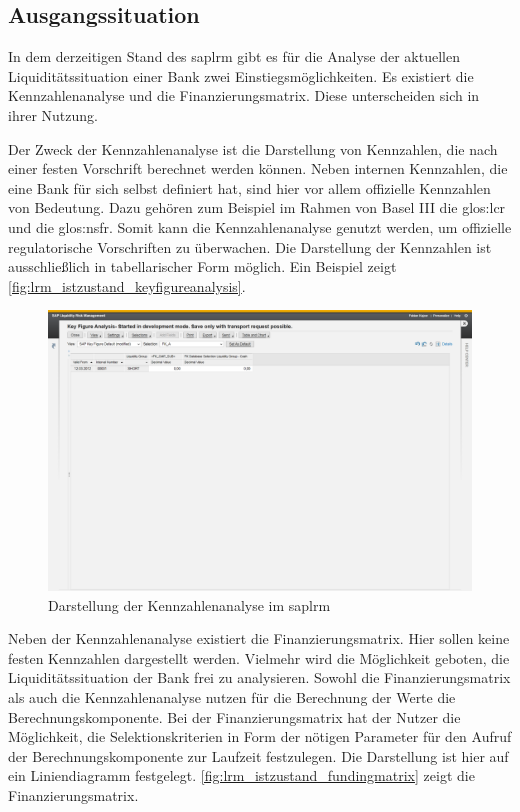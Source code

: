 \begin{onehalfspacing}
\section{Ausgangssituation}
In dem derzeitigen Stand des \gls{saplrm} gibt es für die Analyse der aktuellen Liquiditätssituation einer Bank zwei Einstiegsmöglichkeiten. Es existiert die Kennzahlenanalyse und die Finanzierungsmatrix. Diese unterscheiden sich in ihrer Nutzung.

Der Zweck der Kennzahlenanalyse ist die Darstellung von Kennzahlen, die nach einer festen Vorschrift berechnet werden können. Neben internen Kennzahlen, die eine Bank für sich selbst definiert hat, sind hier vor allem offizielle Kennzahlen von Bedeutung. Dazu gehören zum Beispiel im Rahmen von Basel III die \gls{glos:lcr} und die \gls{glos:nsfr}. Somit kann die Kennzahlenanalyse genutzt werden, um offizielle regulatorische Vorschriften zu überwachen. Die Darstellung der Kennzahlen ist ausschließlich in tabellarischer Form möglich. Ein Beispiel zeigt \vref{fig:lrm_istzustand_keyfigureanalysis}.

\begin{figure}[ht]
\centering
\setlength{\unitlength}{1mm}
\includegraphics[width=15cm]{images/KeyFigureAnalysis_Example-crop.png}
\caption{Darstellung der Kennzahlenanalyse im \gls{saplrm}\label{fig:lrm_istzustand_keyfigureanalysis}}
\end{figure}

Neben der Kennzahlenanalyse existiert die Finanzierungsmatrix. Hier sollen keine festen Kennzahlen dargestellt werden. Vielmehr wird die Möglichkeit geboten, die Liquiditätssituation der Bank frei zu analysieren. Sowohl die Finanzierungsmatrix als auch die Kennzahlenanalyse nutzen für die Berechnung der Werte die Berechnungskomponente. Bei der Finanzierungsmatrix hat der Nutzer die Möglichkeit, die Selektionskriterien in Form der nötigen Parameter für den Aufruf der Berechnungskomponente zur Laufzeit festzulegen. Die Darstellung ist hier auf ein Liniendiagramm festgelegt. \vref{fig:lrm_istzustand_fundingmatrix} zeigt die Finanzierungsmatrix.


\end{onehalfspacing}
